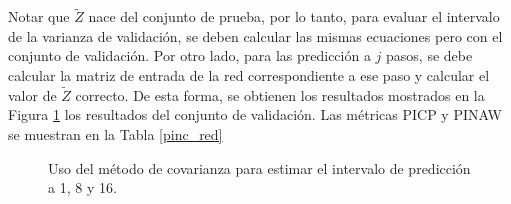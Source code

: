 \documentclass[12pt]{article}
\begin{document}
Notar que $\tilde{Z}$ nace del conjunto de prueba, por lo tanto, para evaluar el intervalo de la varianza de validación, se deben calcular las mismas ecuaciones pero con el conjunto de validación. Por otro lado, para las predicción a $j$ pasos, se debe calcular la matriz de entrada de la red correspondiente a ese paso y calcular el valor de $\tilde{Z}$ correcto. De esta forma, se obtienen los resultados mostrados en la Figura \ref{cov_val} los resultados del conjunto de validación. Las métricas PICP y PINAW se muestran en la Tabla \ref{pinc_red} 

\begin{figure}[h!]
	\centering
	\captionsetup{justification=centering}
	 \newline
	\caption{Uso del método de covarianza para estimar el intervalo de predicción a 1, 8 y 16.}
	\label{cov_val}
\end{figure}
\end{document}
